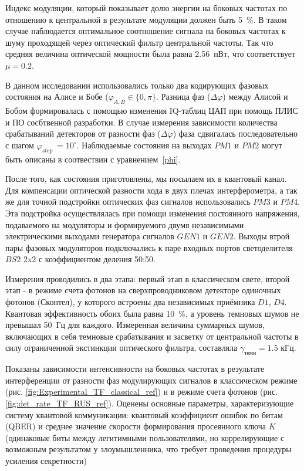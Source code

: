 Индекс модуляции, который показывает долю энергии на боковых частотах по отношению к центральной в результате модуляции должен быть 5~\%. В таком случае наблюдается оптимальное соотношение сигнала на боковых частотах к шуму проходящей через оптический фильтр центральной частоты.  Так что средняя величина оптической мощности была равна 2.56~пВт, что соответствует $\mu=0.2$.  


В данном исследовании  использовались только два кодирующих фазовых состояния на Алисе и Бобе ($\varphi_{A,B}\in\{0,\pi\}$. Разница фаз ($\Delta\varphi$) между Алисой и Бобом формировалась с помощью изменения IQ-таблиц ЦАП при помощь ПЛИС и ПО сосбтвенной разработки. В случае измерения зависимости количества срабатываний детекторов от разности фаз ($\Delta\varphi$) фаза сдвигалась последовательно с шагом $\varphi_{step}\ = 10^{\circ}$. Наблюдаемые состояния на выходах $PM1$ и $PM2$ могут быть описаны в соотвествии с уравнением~\ref{phi}.

После того, как состояния приготовлены, мы посылаем их в квантовый канал. Для компенсации оптической разности хода в двух плечах интерферометра, а так же для точной подстройки оптических фаз сигналов использовались $PM3$ и $PM4$. Эта подстройка осуществлялась при помощи изменения постоянного напряжения, подаваемого на модуляторы и формируемого двумя независимыми электрическими выходами генератора сигналов $GEN1$ и $GEN2$. Выходы втрой пары фазовых модуляторов подключались к паре входных портов светоделителя $BS2$ 2x2 с коэффициентом деления 50:50.

Измерения проводились в два этапа: первый этап в классическом свете, второй этап - в режиме счета фотонов на сверхпроводниковом детекторе одиночных фотонов (Сконтел), у которого встроены два независимых приёмника $D1$, $D4$. Квантовая эффективность обоих была равна 10~\%, а уровень темновых шумов не превышал 50~Гц для каждого. Измеренная величина суммарных шумов, включающих в себя темновые срабатывания и засветку от центральной частоты в силу ограниченной экстинкции оптического фильтра, составляла $\gamma_{темн}=1.5$ кГц.

Показаны зависимости интенсивности на боковых частотах в результате интерференции от разности фаз модулирующих сигналов в классическом режиме (рис. \ref{fig:Experimental_TF_classical_ref}) и в режиме счета фотонов (рис. \ref{fig:det_rate_TF_RUS_ref}). Оценены основные параметры, характеризующие систему квантовой коммуникации: квантовый коэффициент ошибок по битам (QBER) и среднее значение скорости формирования просеянного ключа $K$ (одинаковые биты между легитимными пользователями, но коррелирующие с возможным результатом у злоумышленника, что требует проведения процедуры усиления секретности) 



